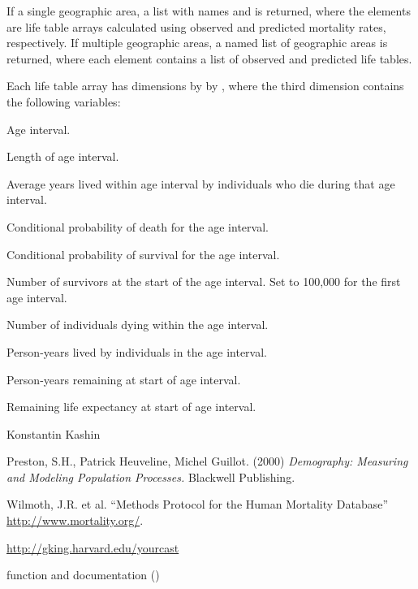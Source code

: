 \begin{Value}
If a single geographic area, a list with names  and  is returned, where the elements are life table arrays calculated using observed and predicted mortality rates, respectively. If multiple geographic areas, a named list of geographic areas is returned, where each element contains a list of observed and predicted life tables.

Each life table array has dimensions  by  by , where the third dimension contains the following variables:
\begin{ldescription}
\item[\code{x}] Age interval.
\item[\code{nx}] Length of age interval.
\item[\code{ax}] Average years lived within age interval by individuals who die during that age interval.
\item[\code{qx}] Conditional probability of death for the age interval.
\item[\code{px}] Conditional probability of survival for the age interval.
\item[\code{lx}] Number of survivors at the start of the age interval. Set to 100,000 for the first age interval.
\item[\code{dx}] Number of individuals dying within the age interval.
\item[\code{Lx}] Person-years lived by individuals in the age interval.
\item[\code{Tx}] Person-years remaining at start of age interval.
\item[\code{ex}] Remaining life expectancy at start of age interval.
\end{ldescription}
\end{Value}
%
\begin{Author}\relax
Konstantin Kashin 
\end{Author}
%
\begin{References}\relax
Preston, S.H., Patrick Heuveline, Michel Guillot. (2000) \emph{Demography: Measuring and Modeling Population Processes.} Blackwell Publishing.

Wilmoth, J.R. et al. ``Methods Protocol for the Human Mortality Database'' \url{http://www.mortality.org/}.

\url{http://gking.harvard.edu/yourcast}
\end{References}
%
\begin{SeeAlso}\relax
{} function and documentation
()
\end{SeeAlso}
